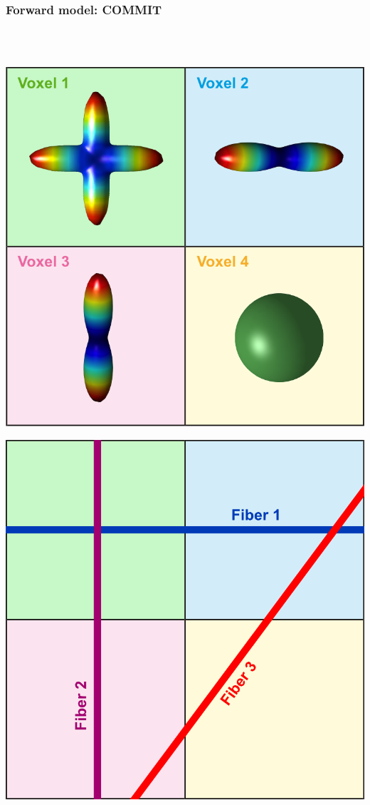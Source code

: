 \documentclass[aspectratio=169]{beamer}
\begin{document}
		\begin{frame}
		\frametitle{Forward model: COMMIT}
		\quad \\ \quad \\
		\begin{center}
		\begin{minipage}{.15\linewidth}
		\begin{center}
		\includegraphics[width=\linewidth]{img/commit/COMMIT_idea_1_var}
		\end{center}
		\end{minipage}\qquad \qquad
		\begin{minipage}{.15\linewidth}
		\begin{center}
		\includegraphics[width=\linewidth]{img/commit/COMMIT_idea_2_var}
		\end{center}
		\end{minipage}
		

\end{center}
\end{frame}
\end{document}
